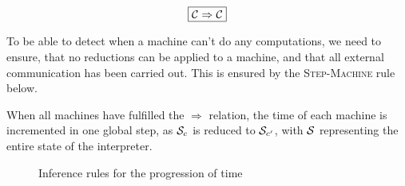 \[\boxed{\C\Rightarrow\C}\]

To be able to detect when a machine can't do any computations, we need to
ensure, that no reductions can be applied to a machine, and that all external
communication has been carried out. This is ensured by the
\textsc{Step-Machine} rule below.

When all machines have fulfilled the $\Rightarrow$ relation, the time of each machine is
incremented in one global step, as $\S_c$ is reduced to $\S_{c'}$, with $\S$ representing
the entire state of the interpreter.

\begin{figure}[!h]
\caption{Inference rules for the progression of time}\label{fig:rule:time-step}
\end{figure}

